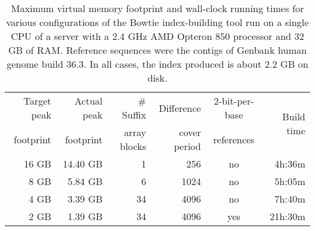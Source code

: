 \documentclass[letterpaper]{article}
\begin{document}
\begin{table}[tp]
\scriptsize
\begin{tabular}{rrrrcr}\toprule
Target peak & Actual peak & \# Suffix   & Difference   & 2-bit-per-base & \multirow{2}{*}{Build time} \\
footprint   & footprint   & array blocks & cover period & references     & \\ 
\toprule
16 GB & 14.40 GB & 1
 & 256
 & no & 4h:36m \\\midrule
8 GB & 5.84 GB & 6
 & 1024
 & no & 5h:05m \\\midrule
4 GB & 3.39 GB & 34
 & 4096
 & no & 7h:40m \\\midrule
2 GB & 1.39 GB & 34
 & 4096
 & yes & 21h:30m \\
\bottomrule
\end{tabular}
\caption{Maximum virtual memory footprint and wall-clock running times for various configurations of the Bowtie index-building tool run on a single CPU of a server with a 2.4 GHz AMD Opteron 850 processor and 32 GB of RAM. Reference sequences were the contigs of Genbank human genome build 36.3. In all cases, the index produced is about 2.2 GB on disk. }
\end{table}
\end{document}
